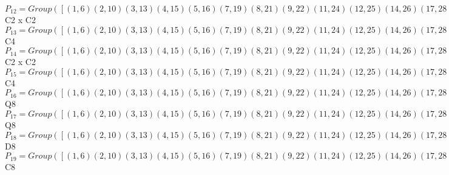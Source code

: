 \documentclass[varwidth=\maxdimen,border=10]{standalone}
\begin{document}
\begin{tabular}
$P_{12} = Group( [ ( 1, 6)( 2,10)( 3,13)( 4,15)( 5,16)( 7,19)( 8,21)( 9,22)(11,24)(12,25)(14,26)(17,28)(18,29)(20,30)(23,31)(27,32), ( 1, 3)( 2, 7)( 4,11)( 5,25)( 6,13)( 8,17)( 9,29)(10,19)(12,16)(14,31)(15,24)(18,22)(20,32)(21,28)(23,26)(27,30) ] )\cong$ C2 x C2\ \\
$P_{13} = Group( [ ( 1, 6)( 2,10)( 3,13)( 4,15)( 5,16)( 7,19)( 8,21)( 9,22)(11,24)(12,25)(14,26)(17,28)(18,29)(20,30)(23,31)(27,32), ( 1, 8, 6,21)( 2,15,10, 4)( 3,27,13,32)( 5,30,16,20)( 7,31,19,23)( 9,14,22,26)(11,18,24,29)(12,17,25,28) ] )\cong$ C4\ \\
$P_{14} = Group( [ ( 1, 6)( 2,10)( 3,13)( 4,15)( 5,16)( 7,19)( 8,21)( 9,22)(11,24)(12,25)(14,26)(17,28)(18,29)(20,30)(23,31)(27,32), ( 1,11)( 2,17)( 3, 4)( 5,31)( 6,24)( 7, 8)( 9,32)(10,28)(12,26)(13,15)(14,25)(16,23)(18,30)(19,21)(20,29)(22,27) ] )\cong$ C2 x C2\ \\
$P_{15} = Group( [ ( 1, 6)( 2,10)( 3,13)( 4,15)( 5,16)( 7,19)( 8,21)( 9,22)(11,24)(12,25)(14,26)(17,28)(18,29)(20,30)(23,31)(27,32), ( 1, 2, 6,10)( 3,18,13,29)( 4, 8,15,21)( 5,22,16, 9)( 7,25,19,12)(11,27,24,32)(14,30,26,20)(17,31,28,23) ] )\cong$ C4\ \\
$P_{16} = Group( [ ( 1, 6)( 2,10)( 3,13)( 4,15)( 5,16)( 7,19)( 8,21)( 9,22)(11,24)(12,25)(14,26)(17,28)(18,29)(20,30)(23,31)(27,32), ( 1, 5, 6,16)( 2, 9,10,22)( 3,12,13,25)( 4,14,15,26)( 7,18,19,29)( 8,20,21,30)(11,23,24,31)(17,27,28,32), ( 1, 2, 6,10)( 3,18,13,29)( 4, 8,15,21)( 5,22,16, 9)( 7,25,19,12)(11,27,24,32)(14,30,26,20)(17,31,28,23) ] )\cong$ Q8\ \\
$P_{17} = Group( [ ( 1, 6)( 2,10)( 3,13)( 4,15)( 5,16)( 7,19)( 8,21)( 9,22)(11,24)(12,25)(14,26)(17,28)(18,29)(20,30)(23,31)(27,32), ( 1, 5, 6,16)( 2, 9,10,22)( 3,12,13,25)( 4,14,15,26)( 7,18,19,29)( 8,20,21,30)(11,23,24,31)(17,27,28,32), ( 1, 8, 6,21)( 2,15,10, 4)( 3,27,13,32)( 5,30,16,20)( 7,31,19,23)( 9,14,22,26)(11,18,24,29)(12,17,25,28) ] )\cong$ Q8\ \\
$P_{18} = Group( [ ( 1, 6)( 2,10)( 3,13)( 4,15)( 5,16)( 7,19)( 8,21)( 9,22)(11,24)(12,25)(14,26)(17,28)(18,29)(20,30)(23,31)(27,32), ( 1, 5, 6,16)( 2, 9,10,22)( 3,12,13,25)( 4,14,15,26)( 7,18,19,29)( 8,20,21,30)(11,23,24,31)(17,27,28,32), ( 1,11)( 2,17)( 3, 4)( 5,31)( 6,24)( 7, 8)( 9,32)(10,28)(12,26)(13,15)(14,25)(16,23)(18,30)(19,21)(20,29)(22,27) ] )\cong$ D8\ \\
$P_{19} = Group( [ ( 1, 6)( 2,10)( 3,13)( 4,15)( 5,16)( 7,19)( 8,21)( 9,22)(11,24)(12,25)(14,26)(17,28)(18,29)(20,30)(23,31)(27,32), ( 1, 5, 6,16)( 2, 9,10,22)( 3,12,13,25)( 4,14,15,26)( 7,18,19,29)( 8,20,21,30)(11,23,24,31)(17,27,28,32), ( 1,18,16, 7, 6,29, 5,19)( 2,25,22,13,10,12, 9, 3)( 4,27,26,17,15,32,14,28)( 8,31,30,24,21,23,20,11) ] )\cong$ C8\ \\

\end{tabular}
\end{document}
